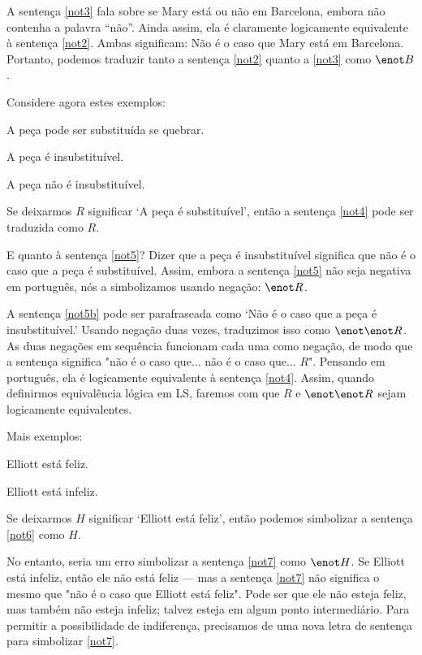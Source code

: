 A sentença \ref{not3} fala sobre se Mary está ou não em Barcelona, embora não contenha a palavra ``não''. Ainda assim, ela é claramente logicamente equivalente à sentença \ref{not2}. Ambas significam: Não é o caso que Mary está em Barcelona. Portanto, podemos traduzir tanto a sentença \ref{not2} quanto a \ref{not3} como $\enot B$.


Considere agora estes exemplos:
\begin{earg}
\item[\ex{not4}] A peça pode ser substituída se quebrar.
\item[\ex{not5}] A peça é insubstituível.
\item[\ex{not5b}] A peça não é insubstituível.
\end{earg}

Se deixarmos $R$ significar `A peça é substituível', então a sentença \ref{not4} pode ser traduzida como $R$.

E quanto à sentença \ref{not5}? Dizer que a peça é insubstituível significa que não é o caso que a peça é substituível. Assim, embora a sentença \ref{not5} não seja negativa em português, nós a simbolizamos usando negação: $\enot R$.

A sentença \ref{not5b} pode ser parafraseada como `Não é o caso que a peça é insubstituível.' Usando negação duas vezes, traduzimos isso como $\enot\enot R$. As duas negações em sequência funcionam cada uma como negação, de modo que a sentença significa "não é o caso que$\ldots$ não é o caso que$\ldots$ $R$". Pensando em português, ela é logicamente equivalente à sentença \ref{not4}. Assim, quando definirmos equivalência lógica em LS, faremos com que $R$ e $\enot\enot R$ sejam logicamente equivalentes.

Mais exemplos:
\begin{earg}
\item[\ex{not6}] Elliott está feliz.
\item[\ex{not7}] Elliott está infeliz.
\end{earg}

Se deixarmos $H$ significar `Elliott está feliz', então podemos simbolizar a sentença \ref{not6} como $H$.

No entanto, seria um erro simbolizar a sentença \ref{not7} como $\enot H$. Se Elliott está infeliz, então ele não está feliz — mas a sentença \ref{not7} não significa o mesmo que "não é o caso que Elliott está feliz". Pode ser que ele não esteja feliz, mas também não esteja infeliz; talvez esteja em algum ponto intermediário. Para permitir a possibilidade de indiferença, precisamos de uma nova letra de sentença para simbolizar \ref{not7}.

